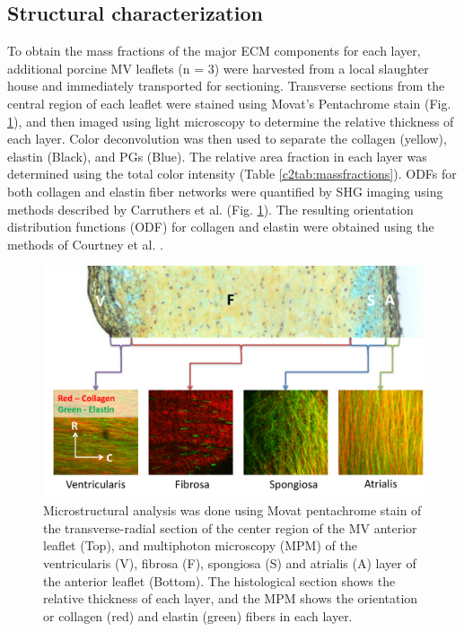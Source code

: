






\subsection{Structural characterization} \label{c2sec:structure}

    To obtain the mass fractions of the major ECM components for each layer, additional porcine MV leaflets (n = 3) were harvested from a local slaughter house and immediately transported for sectioning. Transverse sections from the central region of each leaflet were stained using Movat’s Pentachrome stain (Fig. \ref{c2:fig:2}), and then imaged using light microscopy to determine the relative thickness of each layer. Color deconvolution was then used to separate the collagen (yellow), elastin (Black), and PGs (Blue). The relative area fraction in each layer was determined using the total color intensity (Table \ref{c2tab:massfractions}). ODFs for both collagen and elastin fiber networks were quantified by SHG imaging using methods described by Carruthers et al. \cite{carruthers_alterations_2012} (Fig. \ref{c2:fig:2}). The resulting orientation distribution functions (ODF) for collagen and elastin were obtained using the methods of Courtney et al. \cite{courtney_design_2006}.
    
    


\begin{figure}
\centering
\includegraphics[width=\textwidth]{Images/chapter2/figure2.pdf}
\caption{Microstructural analysis was done using Movat pentachrome stain of the transverse-radial section of the center region of the MV anterior leaflet (Top), and multiphoton microscopy (MPM) of the ventricularis (V), fibrosa (F), spongiosa (S) and atrialis (A) layer of the anterior leaflet (Bottom). The histological section shows the relative thickness of each layer, and the MPM shows the orientation or collagen (red) and elastin (green) fibers in each layer.}
\label{c2:fig:2}
\end{figure}




